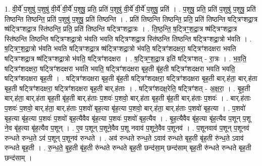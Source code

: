 \documentclass[17pt]{extarticle}
\begin{document}
1. वी॒र्ये॑ प॒शुषु॑ प॒शुषु॑ वी॒र्ये॑ वी॒र्ये॑ प॒शुषु॒ प्रति॒ प्रति॑ प॒शुषु॑ वी॒र्ये॑ वी॒र्ये॑ प॒शुषु॒ प्रति॑ । . प॒शुषु॒ प्रति॒ प्रति॑ प॒शुषु॑ प॒शुषु॒ प्रति॑ तिष्ठन्ति तिष्ठन्ति॒ प्रति॑ प॒शुषु॑ प॒शुषु॒ प्रति॑ तिष्ठन्ति । . प्रति॑ तिष्ठन्ति तिष्ठन्ति॒ प्रति॒ प्रति॑ तिष्ठन्ति षट्त्रिꣳशद्रा॒त्र ष्ष॑ट्त्रिꣳशद्रा॒त्र स्ति॑ष्ठन्ति॒ प्रति॒ प्रति॑ तिष्ठन्ति षट्त्रिꣳशद्रा॒त्रः । . ति॒ष्ठ॒न्ति॒ ष॒ट्त्रिꣳ॒॒श॒द्रा॒त्र ष्ष॑ट्त्रिꣳशद्रा॒त्र स्ति॑ष्ठन्ति तिष्ठन्ति षट्त्रिꣳशद्रा॒त्रो भ॑वति भवति षट्त्रिꣳशद्रा॒त्र स्ति॑ष्ठन्ति तिष्ठन्ति षट्त्रिꣳशद्रा॒त्रो भ॑वति । . ष॒ट्त्रिꣳ॒॒श॒द्रा॒त्रो भ॑वति भवति षट्त्रिꣳशद्रा॒त्र ष्ष॑ट्त्रिꣳशद्रा॒त्रो भ॑वति॒ षट्त्रिꣳ॑शदक्षरा॒ षट्त्रिꣳ॑शदक्षरा भवति षट्त्रिꣳशद्रा॒त्र ष्ष॑ट्त्रिꣳशद्रा॒त्रो भ॑वति॒ षट्त्रिꣳ॑शदक्षरा । . ष॒ट्त्रिꣳ॒॒श॒द्रा॒त्र इति॑ षट्त्रिꣳशत् - रा॒त्रः । . भ॒व॒ति॒ षट्त्रिꣳ॑शदक्षरा॒ षट्त्रिꣳ॑शदक्षरा भवति भवति॒ षट्त्रिꣳ॑शदक्षरा बृह॒ती बृ॑ह॒ती षट्त्रिꣳ॑शदक्षरा भवति भवति॒ षट्त्रिꣳ॑शदक्षरा बृह॒ती । . षट्त्रिꣳ॑शदक्षरा बृह॒ती बृ॑ह॒ती षट्त्रिꣳ॑शदक्षरा॒ षट्त्रिꣳ॑शदक्षरा बृह॒ती बार्.ह॑ता॒ बार्.ह॑ता बृह॒ती षट्त्रिꣳ॑शदक्षरा॒ षट्त्रिꣳ॑शदक्षरा बृह॒ती बार्.ह॑ताः । . षट्त्रिꣳ॑शदक्ष॒रेति॒ षट्त्रिꣳ॑शत् - अ॒क्ष॒रा॒ । . बृ॒ह॒ती बार्.ह॑ता॒ बार्.ह॑ता बृह॒ती बृ॑ह॒ती बार्.ह॑ताः प॒शवः॑ प॒शवो॒ बार्.ह॑ता बृह॒ती बृ॑ह॒ती बार्.ह॑ताः प॒शवः॑ । . बार्.ह॑ताः प॒शवः॑ प॒शवो॒ बार्.ह॑ता॒ बार्.ह॑ताः प॒शवो॑ बृह॒त्या बृ॑ह॒त्या प॒शवो॒ बार्.ह॑ता॒ बार्.ह॑ताः प॒शवो॑ बृह॒त्या । . प॒शवो॑ बृह॒त्या बृ॑ह॒त्या प॒शवः॑ प॒शवो॑ बृह॒त्यैवैव बृ॑ह॒त्या प॒शवः॑ प॒शवो॑ बृह॒त्यैव । . बृ॒ह॒त्यैवैव बृ॑ह॒त्या बृ॑ह॒त्यैव प॒शून् प॒शू ने॒व बृ॑ह॒त्या बृ॑ह॒त्यैव प॒शून् । . ए॒व प॒शून् प॒शूने॒वैव प॒शू नवाव॑ प॒शूने॒वैव प॒शूनव॑ । . प॒शूनवाव॑ प॒शून् प॒शूनव॑ रुन्धते रुन्ध॒ते ऽव॑ प॒शून् प॒शूनव॑ रुन्धते । . अव॑ रुन्धते रुन्ध॒ते ऽवाव॑ रुन्धते बृह॒ती बृ॑ह॒ती रु॑न्ध॒ते ऽवाव॑ रुन्धते बृह॒ती । . रु॒न्ध॒ते॒ बृ॒ह॒ती बृ॑ह॒ती रु॑न्धते रुन्धते बृह॒ती छन्द॑सा॒म् छन्द॑साम् बृह॒ती रु॑न्धते रुन्धते बृह॒ती छन्द॑साम् । \newline
\end{document}
